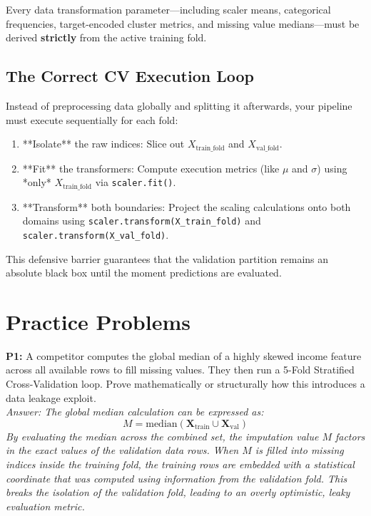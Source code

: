 \documentclass{article}
\begin{document}
\begin{tcolorbox}[colback=red!5!white,colframe=red!70!black,title=The Defensive Isolation Rule]
Every data transformation parameter—including scaler means, categorical frequencies, target-encoded cluster metrics, and missing value medians—must be derived \textbf{strictly} from the active training fold.
\end{tcolorbox}

\subsection{The Correct CV Execution Loop}
Instead of preprocessing data globally and splitting it afterwards, your pipeline must execute sequentially for each fold:
\begin{enumerate}
    \item **Isolate** the raw indices: Slice out $X_{\text{train\_fold}}$ and $X_{\text{val\_fold}}$.
    \item **Fit** the transformers: Compute execution metrics (like $\mu$ and $\sigma$) using *only* $X_{\text{train\_fold}}$ via \texttt{scaler.fit()}.
    \item **Transform** both boundaries: Project the scaling calculations onto both domains using \texttt{scaler.transform(X\_train\_fold)} and \texttt{scaler.transform(X\_val\_fold)}.
\end{enumerate}
This defensive barrier guarantees that the validation partition remains an absolute black box until the moment predictions are evaluated.

\newpage
\section{Practice Problems}

\textbf{P1:} A competitor computes the global median of a highly skewed income feature across all available rows to fill missing values. They then run a 5-Fold Stratified Cross-Validation loop. Prove mathematically or structurally how this introduces a data leakage exploit.
\\
\textit{Answer: The global median calculation can be expressed as:
\begin{equation*}
    M = \text{median}(\mathbf{X}_{\text{train}} \cup \mathbf{X}_{\text{val}})
\end{equation*}
By evaluating the median across the combined set, the imputation value $M$ factors in the exact values of the validation data rows. When $M$ is filled into missing indices inside the training fold, the training rows are embedded with a statistical coordinate that was computed using information from the validation fold. This breaks the isolation of the validation fold, leading to an overly optimistic, leaky evaluation metric.}
\end{document}

